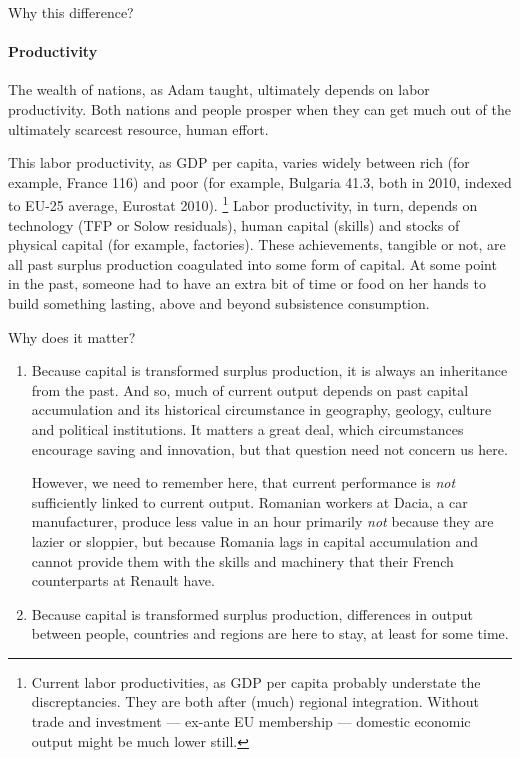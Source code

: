 Why this difference?

\paragraph{Productivity}
The wealth of nations, as Adam \cite{Smith-1776-lq} taught, ultimately depends on labor productivity.
Both nations and people prosper when they can get much out of the ultimately scarcest resource, human effort.

This labor productivity, as \gls{GDP} per capita, varies widely between rich (for example, France 116) and poor (for example, Bulgaria 41.3, both in 2010, indexed to EU-25 average, Eurostat 2010).
\footnote{
	Current labor productivities, as \gls{GDP} per capita probably understate the discreptancies.
	They are both after (much) regional integration.
	Without trade and investment --- ex-ante EU membership --- domestic economic output might be much lower still.
}
Labor productivity, in turn, depends on technology (\gls{TFP} or Solow residuals), human capital (skills) and stocks of physical capital (for example, factories).
These achievements, tangible or not, are all past surplus production coagulated into some form of capital.
At some point in the past, someone had to have an extra bit of time or food on her hands to build something lasting, above and beyond subsistence consumption.


Why does it matter?

\begin{enumerate}
	\item Because capital is transformed surplus production, it is always an inheritance from the past.
	And so, much of current output depends on past capital accumulation and its historical circumstance in geography, geology, culture and political institutions.
	It matters a great deal, which circumstances encourage saving and innovation, but that question need not concern us here.

	However, we need to remember here, that current performance is \emph{not} sufficiently linked to current output.
	Romanian workers at Dacia, a car manufacturer, produce less value in an hour primarily \emph{not} because they are lazier or sloppier, but because Romania lags in capital accumulation and cannot provide them with the skills and machinery that their French counterparts at Renault have.

	\item Because capital is transformed surplus production, differences in output between people, countries and regions are here to stay, at least for some time.
\end{enumerate}

